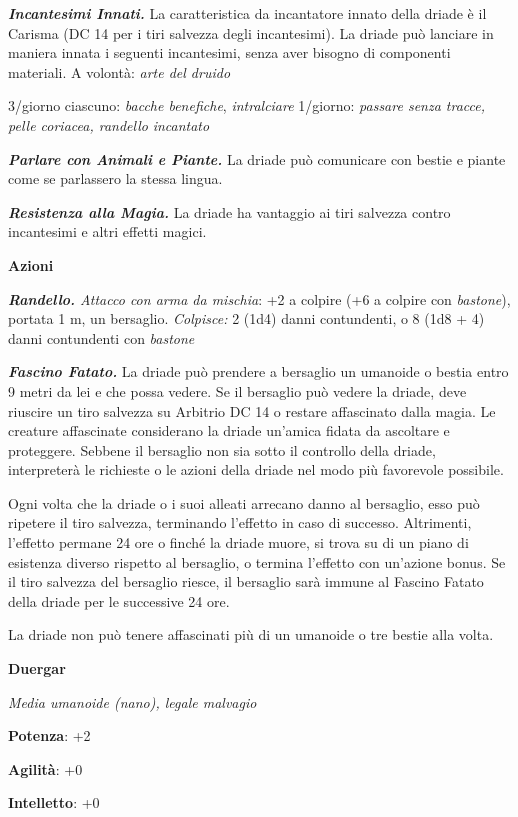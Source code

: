 \begin{multicols}{2}
\emph{\textbf{Incantesimi Innati.}} La caratteristica da incantatore
innato della driade è il Carisma (DC 14 per i tiri salvezza degli
incantesimi). La driade può lanciare in maniera innata i seguenti
incantesimi, senza aver bisogno di componenti materiali. A volontà:
\emph{arte del druido}

3/giorno ciascuno: \emph{bacche benefiche}, \emph{intralciare} 1/giorno:
\emph{passare senza tracce, pelle coriacea, randello} \emph{incantato}

\emph{\textbf{Parlare con Animali e Piante.}} La driade può comunicare
con bestie e piante come se parlassero la stessa lingua.

\emph{\textbf{Resistenza alla Magia.}} La driade ha vantaggio ai tiri
salvezza contro incantesimi e altri effetti magici.

\smallskip\textbf{Azioni}

\emph{\textbf{Randello.} Attacco con arma da mischia}: +2 a colpire (+6
a colpire con \emph{bastone}), portata 1 m, un bersaglio.
\emph{Colpisce:} 2 (1d4) danni contundenti, o 8 (1d8 + 4) danni
contundenti con \emph{bastone}

\emph{\textbf{Fascino Fatato.}} La driade può prendere a bersaglio un
umanoide o bestia entro 9 metri da lei e che possa vedere. Se il
bersaglio può vedere la driade, deve riuscire un tiro salvezza su Arbitrio DC 14 o restare affascinato dalla magia. Le creature
affascinate considerano la driade un'amica fidata da ascoltare e
proteggere. Sebbene il bersaglio non sia sotto il controllo della
driade, interpreterà le richieste o le azioni della driade nel modo più
favorevole possibile.

Ogni volta che la driade o i suoi alleati arrecano danno al bersaglio,
esso può ripetere il tiro salvezza, terminando l'effetto in caso di
successo. Altrimenti, l'effetto permane 24 ore o finché la driade muore,
si trova su di un piano di esistenza diverso rispetto al bersaglio, o
termina l'effetto con un'azione bonus. Se il tiro salvezza del bersaglio
riesce, il bersaglio sarà immune al Fascino Fatato della driade per le
successive 24 ore.

La driade non può tenere affascinati più di un umanoide o tre bestie
alla volta.

\textbf{Duergar}

\emph{Media umanoide (nano), legale malvagio}

\textbf{Potenza}: +2

\textbf{Agilità}: +0

\textbf{Intelletto}: +0


\end{multicols}
